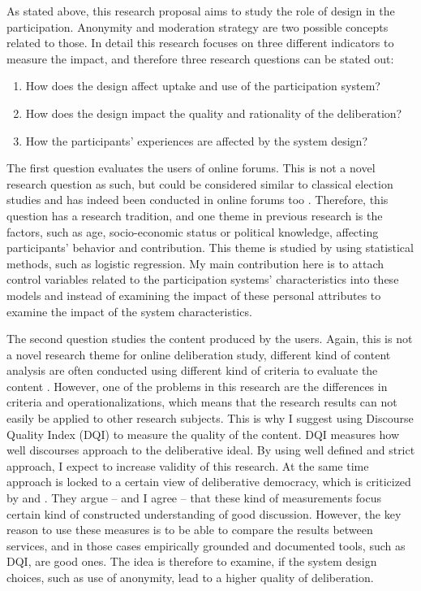 \documentclass{article}
\begin{document}
As stated above, this research proposal aims to study the role of design in the participation. Anonymity and moderation strategy are two possible concepts related to those. In detail this research focuses on three different indicators to measure the impact, and therefore three research questions can be stated out:

\begin{enumerate}
\item How does the design affect uptake and use of the participation system?
\item How does the design impact the quality and rationality of the deliberation?
\item How the participants' experiences are affected by the system design?
\end{enumerate}

The first question evaluates the users of online forums. This is not a novel research question as such, but could be considered similar to classical election studies and has indeed been conducted in online forums too . Therefore, this question has a research tradition, and one theme in previous research is the factors, such as age, socio-economic status or political knowledge, affecting participants' behavior and contribution. This theme is studied by using statistical methods, such as logistic regression. My main contribution here is to attach control variables related to the participation systems' characteristics into these models and instead of examining the impact of these personal attributes to examine the impact of the system characteristics.

The second question studies the content produced by the users. Again, this is not a novel research theme for online deliberation study, different kind of content analysis are often conducted using different kind of criteria to evaluate the content . However, one of the problems in this research are the differences in criteria and operationalizations, which means that the research results can not easily be applied to other research subjects. This is why I suggest using   Discourse Quality Index (DQI) to measure the quality of the content. DQI measures how well discourses approach to the deliberative ideal. By using well defined and strict approach, I expect to increase validity of this research. At the same time  approach is locked to a certain view of deliberative democracy, which is criticized by  and . They argue -- and I agree -- that these kind of measurements focus certain kind of constructed understanding of good discussion. However, the key reason to use these measures is to be able to compare the results between services, and in those cases empirically grounded and documented tools, such as DQI, are good ones. The idea is therefore to examine, if the system design choices, such as use of anonymity, lead to a higher quality of deliberation.
\end{document}
